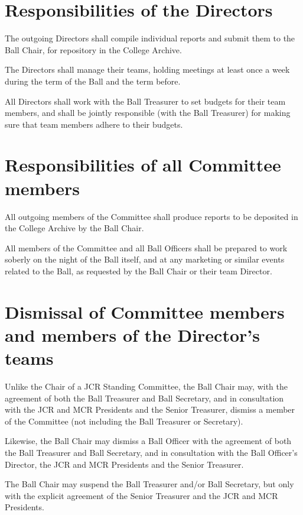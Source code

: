\section{Responsibilities of the Directors}

\appnpara The outgoing Directors shall compile individual reports and submit them to the Ball Chair, for repository in the College Archive.

\appnpara The Directors shall manage their teams, holding meetings at least once a week during the term of the Ball and the term before.

\appnpara All Directors shall work with the Ball Treasurer to set budgets for their team members, and shall be jointly responsible (with the Ball Treasurer) for making sure that team members adhere to their budgets. 

\section{Responsibilities of all Committee members}

\appnpara All outgoing members of the Committee shall produce reports to be deposited in the College Archive by the Ball Chair.  

\appnpara All members of the Committee and all Ball Officers shall be prepared to work soberly on the night of the Ball itself, and at any marketing or similar events related to the Ball, as requested by the Ball Chair or their team Director.

\section{Dismissal of Committee members and members of the Director's teams}

\appnpara Unlike the Chair of a JCR Standing Committee, the Ball Chair may, with the agreement of both the Ball Treasurer and Ball Secretary, and in consultation with the JCR and MCR Presidents and the Senior Treasurer, dismiss a member of the Committee (not including the Ball Treasurer or Secretary).  

\appnpara Likewise, the Ball Chair may dismiss a Ball Officer with the agreement of both the Ball Treasurer and Ball Secretary, and in consultation with the Ball Officer’s Director, the JCR and MCR Presidents and the Senior Treasurer.

\appnpara The Ball Chair may suspend the Ball Treasurer and/or Ball Secretary, but only with the explicit agreement of the Senior Treasurer and the JCR and MCR Presidents.  

